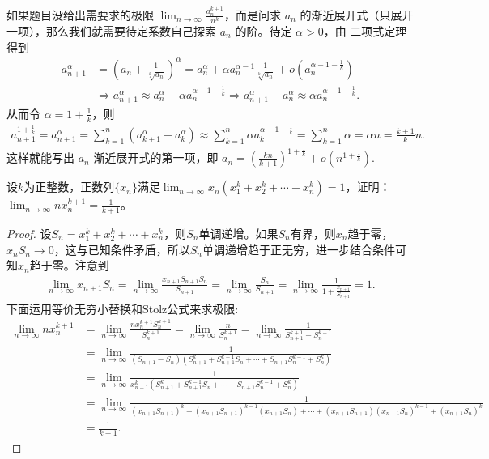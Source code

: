 \documentclass[../../main.tex]{subfiles}
\begin{document}
\begin{remark}
如果题目没给出需要求的极限 \(\lim_{n\rightarrow \infty} \frac{a_{n}^{k + 1}}{n^k}\)，而是问求 \(a_n\) 的渐近展开式（只展开一项），那么我们就需要待定系数自己探索 \(a_n\) 的阶。待定 \(\alpha>0\)，由 二项式定理得到
\begin{align*}
a_{n+1}^{\alpha}&=\left( a_n+\frac{1}{\sqrt[k]{a_n}} \right) ^{\alpha}=a_{n}^{\alpha}+\alpha a_{n}^{\alpha -1}\frac{1}{\sqrt[k]{a_n}}+o\left( a_{n}^{\alpha -1-\frac{1}{k}} \right)\\
&\Rightarrow a_{n+1}^{\alpha}\approx a_{n}^{\alpha}+\alpha a_{n}^{\alpha -1-\frac{1}{k}}\Rightarrow a_{n+1}^{\alpha}-a_{n}^{\alpha}\approx \alpha a_{n}^{\alpha -1-\frac{1}{k}}.
\end{align*}
从而令 \(\alpha = 1+\frac{1}{k}\)，则
\begin{align*}
a_{n+1}^{1+\frac{1}{k}}=a_{n+1}^{\alpha}=\sum_{k=1}^n{\left( a_{k+1}^{\alpha}-a_{k}^{\alpha} \right)}\approx \sum_{k=1}^n{\alpha a_{k}^{\alpha -1-\frac{1}{k}}}=\sum_{k=1}^n{\alpha}=\alpha n=\frac{k+1}{k}n.
\end{align*}
这样就能写出 \(a_n\) 渐近展开式的第一项，即 \(a_n=\left( \frac{kn}{k+1} \right) ^{1+\frac{1}{k}}+o\left( n^{1+\frac{1}{k}} \right) \).
\end{remark}

\begin{example}
设\(k\)为正整数，正数列\(\{x_n\}\)满足\(\lim_{n\rightarrow\infty}x_n(x_1^k + x_2^k+\cdots+x_n^k)=1\)，证明：\(\lim_{n\rightarrow\infty}nx_n^{k + 1}=\frac{1}{k + 1}\)。
\end{example}
\begin{proof}
设\(S_n = x_1^k + x_2^k+\cdots+x_n^k\)，则\(S_n\)单调递增。如果\(S_n\)有界，则\(x_n\)趋于零，\(x_nS_n\rightarrow0\)，这与已知条件矛盾，所以\(S_n\)单调递增趋于正无穷，进一步结合条件可知\(x_n\)趋于零。注意到
\begin{align*}
\lim_{n\rightarrow\infty}x_{n + 1}S_n=\lim_{n\rightarrow\infty}\frac{x_{n + 1}S_{n + 1}S_n}{S_{n + 1}}=\lim_{n\rightarrow\infty}\frac{S_n}{S_{n + 1}}=\lim_{n\rightarrow\infty}\frac{1}{1+\frac{x_{n + 1}}{S_{n + 1}}}=1.
\end{align*}
下面运用等价无穷小替换和Stolz公式来求极限:
\begin{align*}
\lim_{n\rightarrow\infty}nx_n^{k + 1}&=\lim_{n\rightarrow\infty}\frac{nx_n^{k + 1}S_n^{k + 1}}{S_n^{k + 1}}=\lim_{n\rightarrow\infty}\frac{n}{S_n^{k + 1}}=\lim_{n\rightarrow\infty}\frac{1}{S_{n + 1}^{k + 1}-S_n^{k + 1}}\\
&=\lim_{n\rightarrow\infty}\frac{1}{(S_{n + 1}-S_n)(S_{n + 1}^k + S_{n + 1}^{k - 1}S_n+\cdots+S_{n + 1}S_n^{k - 1}+S_n^k)}\\
&=\lim_{n\rightarrow\infty}\frac{1}{x_{n + 1}^{k}(S_{n + 1}^k + S_{n + 1}^{k - 1}S_n+\cdots+S_{n + 1}S_n^{k - 1}+S_n^k)}\\
&=\lim_{n\rightarrow\infty}\frac{1}{(x_{n + 1}S_{n + 1})^k+(x_{n + 1}S_{n + 1})^{k - 1}(x_{n + 1}S_n)+\cdots+(x_{n + 1}S_{n + 1})(x_{n + 1}S_n)^{k - 1}+(x_{n + 1}S_n)^k}\\
&=\frac{1}{k + 1}.
\end{align*}

\end{proof}
\end{document}
